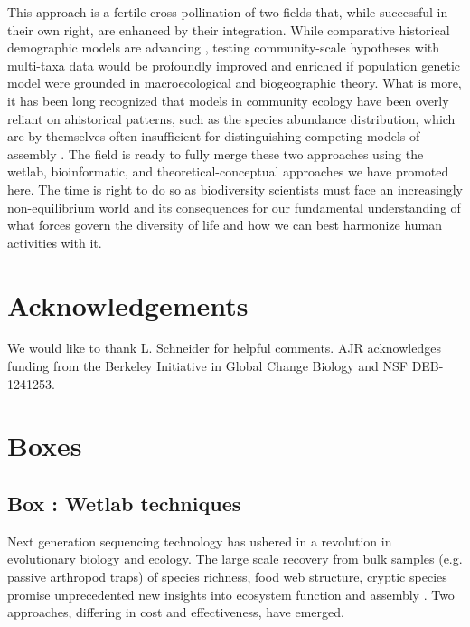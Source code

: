 \documentclass[12pt]{article}
\newcounter{Box}
\begin{document}
This approach is a fertile cross pollination of two fields that, while
successful in their own right, are enhanced by their
integration. While comparative historical demographic models are
advancing \citep{Xue2015-el, Hickerson2006-uf, Carstens2016-mc,
  Chan2014-nq, Satler2016-lb}, testing community-scale hypotheses with
multi-taxa data would be profoundly improved and enriched if
population genetic model were grounded in macroecological and
biogeographic theory.  What is more, it has been long recognized that
models in community ecology have been overly reliant on ahistorical
patterns, such as the species abundance distribution, which are by
themselves often insufficient for distinguishing competing models of
assembly \citep{McGill2007-hx}.  The field is ready to
fully merge these two approaches using the wetlab, bioinformatic, and
theoretical-conceptual approaches we have promoted here. The time is
right to do so as biodiversity scientists must face an increasingly
non-equilibrium world and its consequences for our fundamental
understanding of what forces govern the diversity of life and how we
can best harmonize human activities with it.

\section*{Acknowledgements}

We would like to thank L. Schneider for helpful comments. AJR
acknowledges funding from the Berkeley Initiative in Global Change
Biology and NSF DEB-1241253.

\pagebreak




\pagebreak

\section*{Boxes}


\label{box:wet}
\subsection*{Box \theBox: Wetlab techniques}
    
Next generation sequencing technology has ushered in a revolution in
evolutionary biology and ecology. The large scale recovery from bulk
samples (e.g. passive arthropod traps) of species richness, food web
structure, cryptic species promise unprecedented new insights into
ecosystem function and assembly \citep{krehenwinkel2016,
  shokralla2015, gibson2014, taberlet2012}.  Two approaches, differing
in cost and effectiveness, have emerged.
\end{document}
